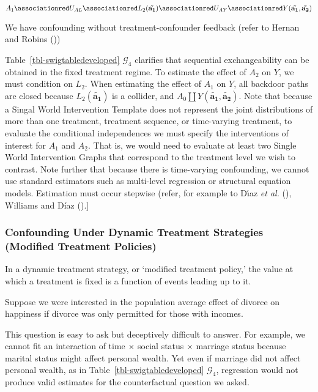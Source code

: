 \documentclass[
  single column]{article}
\begin{document}
\[
A_1 \associationred U_{AL} \associationred L_2({\mathbf{\tilde{a_1}}})  \associationred U_{AY} \associationred Y({\mathbf{\tilde{a_1}, \tilde{a_2}}})
\]

We have confounding without treatment-confounder feedback (refer to
Hernan and Robins ())

Table~\ref{tbl-swigtabledeveloped} \(\mathcal{G}_4\) clarifies that
sequential exchangeability can be obtained in the fixed treatment
regime. To estimate the effect of \(A_2\) on \(Y\), we must condition on
\(L_2\). When estimating the effect of \(A_1\) on \(Y\), all backdoor
paths are closed because \(L_2({\mathbf{\tilde{a_1}}})\) is a collider,
and \(A_0 \coprod Y({\mathbf{\tilde{a_1}, \tilde{a_2}}})\). Note that
because a Singal World Intervention Template does not represent the
joint distributions of more than one treatment, treatment sequence, or
time-varying treatment, to evaluate the conditional independences we
must specify the interventions of interest for \(A_1\) and \(A_2\). That
is, we would need to evaluate at least two Single World Intervention
Graphs that correspond to the treatment level we wish to contrast. Note
further that because there is time-varying confounding, we cannot use
standard estimators such as multi-level regression or structural
equation models. Estimation must occur stepwise (refer, for example to
Dı́az \emph{et al.} (),
Williams and Díaz ().{]}

\subsubsection{Confounding Under Dynamic Treatment Strategies (Modified
Treatment
Policies)}\label{confounding-under-dynamic-treatment-strategies-modified-treatment-policies}

In a dynamic treatment strategy, or `modified treatment policy,' the
value at which a treatment is fixed is a function of events leading up
to it.

Suppose we were interested in the population average effect of divorce
on happiness if divorce was only permitted for those with incomes.

This question is easy to ask but deceptively difficult to answer. For
example, we cannot fit an interaction of time \(\times\) social status
\(\times\) marriage status because marital status might affect personal
wealth. Yet even if marriage did not affect personal wealth, as in
Table~\ref{tbl-swigtabledeveloped} \(\mathcal{G}_4\), regression would
not produce valid estimates for the counterfactual question we asked.
\end{document}
